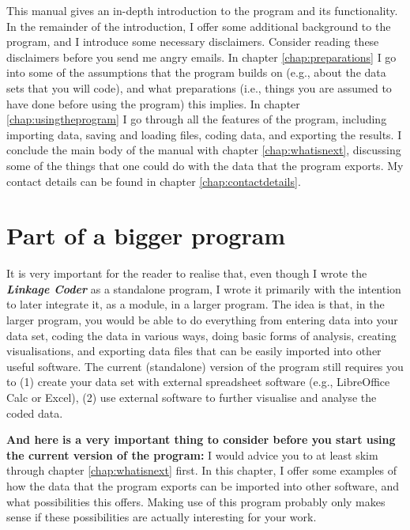 \documentclass{memoir}
\begin{document}
This manual gives an in-depth introduction to the program and its functionality. In the remainder of the introduction, I offer some additional background to the program, and I introduce some necessary disclaimers. Consider reading these disclaimers before you send me angry emails. In chapter \ref{chap:preparations} I go into some of the assumptions that the program builds on (e.g., about the data sets that you will code), and what preparations (i.e., things you are assumed to have done before using the program) this implies. In chapter \ref{chap:usingtheprogram} I go through all the features of the program, including importing data, saving and loading files, coding data, and exporting the results. I conclude the main body of the manual with chapter \ref{chap:whatisnext}, discussing some of the things that one could do with the data that the program exports. My contact details can be found in chapter \ref{chap:contactdetails}. 

\section{Part of a bigger program}
\label{sec:partofbiggerprogram}

It is very important for the reader to realise that, even though I wrote the \textbf{\emph{Linkage Coder}} as a standalone program, I wrote it primarily with the intention to later integrate it, as a module, in a larger program. The idea is that, in the larger program, you would be able to do everything from entering data into your data set, coding the data in various ways, doing basic forms of analysis, creating visualisations, and exporting data files that can be easily imported into other useful software. The current (standalone) version of the program still requires you to (1) create your data set with external spreadsheet software (e.g., LibreOffice Calc or Excel), (2) use external software to further visualise and analyse the coded data.

\textbf{And here is a very important thing to consider before you start using the current version of the program:} I would advice you to at least skim through chapter \ref{chap:whatisnext} first. In this chapter, I offer some examples of how the data that the program exports can be imported into other software, and what possibilities this offers. Making use of this program probably only makes sense if these possibilities are actually interesting for your work.
\end{document}
